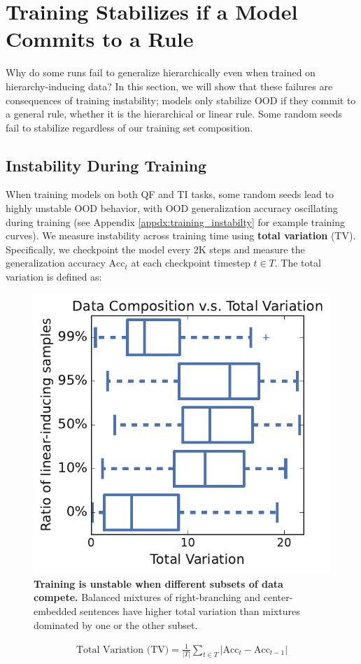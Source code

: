 \section{Training Stabilizes if a Model Commits to a Rule}
\label{sec:stability}
Why do some runs fail to generalize hierarchically even when trained on hierarchy-inducing data? In this section, we will show that these failures are consequences of training instability; models only stabilize OOD if they commit to a general rule, whether it is the hierarchical or linear rule. Some random seeds fail to stabilize regardless of our training set composition.


\subsection{Instability During Training} 
\label{sec:tv_def}
When training models on both QF and TI tasks, some random seeds lead to highly unstable OOD behavior, with OOD generalization accuracy oscillating during training (see Appendix \ref{appdx:training_instabilty} for example training curves). We measure instability across training time using \textbf{total variation} (TV). Specifically, we checkpoint the model every 2K steps and measure the generalization accuracy $\mathrm{Acc}_t$ at each checkpoint timestep $t \in T$. The total variation is defined as: 
\begin{figure}
    \centering
    \vspace{5mm}
    \includegraphics[width=0.85\linewidth]{figures/total_variation_box.pdf}
    \caption{\textbf{Training is unstable when different subsets of data compete.} Balanced mixtures of right-branching and center-embedded sentences have higher total variation than mixtures dominated by one or the other subset.}
    \vspace{-15mm}
    \label{fig:data_drives_inconsistency}
\end{figure}
\begin{align}
    \text{Total Variation (TV)} = 
    \frac{1}{|T|} \sum_{t \in T} 
    \left| \mathrm{Acc}_t - \mathrm{Acc}_{t-1} \right|
\end{align}

